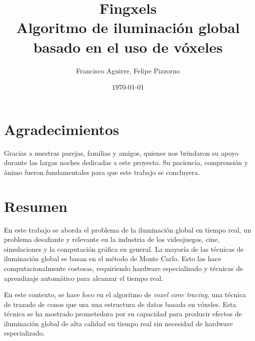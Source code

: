 \documentclass{prgrado}
\title{
	Fingxels \\
	\large Algoritmo de iluminación global basado en el uso de vóxeles
}
\author{Francisco Aguirre, Felipe Pizzorno}
\date{\today} %
\begin{document}

\frontmatter %

\maketitle


\chapter*{Agradecimientos}

Gracias a nuestras parejas, familias y amigos, quienes nos brindaron su apoyo durante las largas noches dedicadas a este proyecto.
Su paciencia, comprensión y ánimo fueron fundamentales para que este trabajo se concluyera.


\chapter*{Resumen}


En este trabajo se aborda el problema de la iluminación global en tiempo real, un problema desafiante y relevante en la industria de los videojuegos, cine, simulaciones y la computación gráfica en general.
La mayoría de las técnicas de iluminación global se basan en el método de Monte Carlo.
Esto las hace computacionalmente costosas, requiriendo hardware especializado y técnicas de aprendizaje automático para alcanzar el tiempo real.

En este contexto, se hace foco en el algoritmo de \textit{voxel cone tracing}, una técnica de trazado de conos que usa una estructura de datos basada en vóxeles.
Esta técnica se ha mostrado prometedora por su capacidad para producir efectos de iluminación global de alta calidad en tiempo real sin necesidad de hardware especializado.
\end{document}
